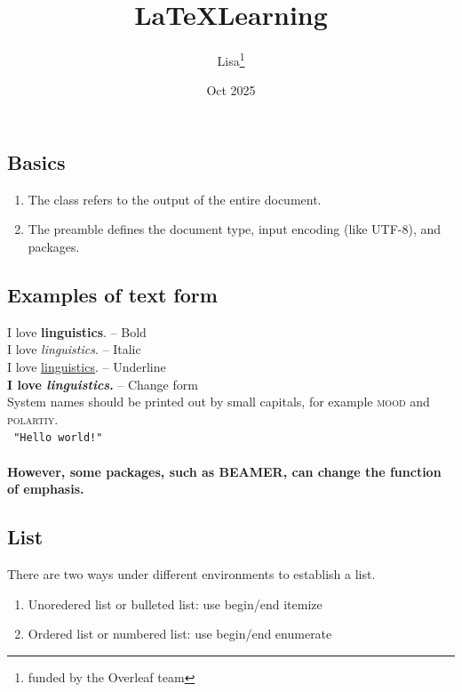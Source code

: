 \documentclass[12pt, letterpaper]{article}
\title{\LaTeX  Learning}
\author{Lisa\thanks{funded by the Overleaf team}}
\date{Oct 2025}
\begin{document}

\maketitle
\thispagestyle{empty} %
\tableofcontents

\begin{spacing}{1.3}
\section{Basics}
\begin{enumerate}
\item The class refers to the output of the entire document.
\item The preamble defines the document type, input encoding (like UTF-8), and packages.
\end{enumerate}

\subsection{Examples of text form}
I love \textbf{linguistics}. -- Bold
\\I love \textit{linguistics}. -- Italic
\\I love \underline{linguistics}. -- Underline
\\\textbf{I love \emph{linguistics}.} -- Change form
\\ System names should be printed out by small capitals, for example \textsc{mood} and \textsc{polartiy}.
\\ \texttt{ "Hello world!"}

\paragraph{However, some packages, such as BEAMER, can change the function of emphasis.}


\subsection{List}
There are two ways under different environments to establish a list. 
\begin{enumerate}
\item Unoredered list or bulleted list: use begin/end itemize
\item Ordered list or numbered list: use begin/end enumerate
\end{enumerate}


\end{spacing}
\end{document}
